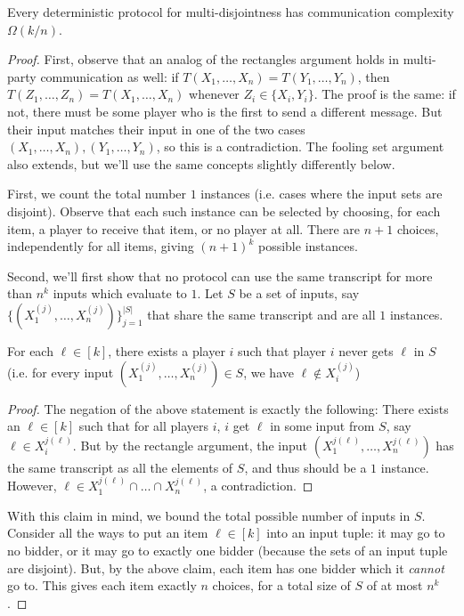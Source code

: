     \begin{theorem}
      Every deterministic protocol for
      multi-disjointness has communication complexity $\Omega(k/n)$.
    \end{theorem}
    \begin{proof}
      First, observe that an analog of the rectangles argument holds in
      multi-party communication as well: if $T(X_1,\ldots, X_n) = T(Y_1,\ldots,
      Y_n)$, then $T(Z_1,\ldots, Z_n) = T(X_1,\ldots, X_n)$ whenever $Z_i \in \{X_i,
      Y_i\}$. The proof is the same: if not, there must be some player who is the
      first to send a different message. But their input matches their input in one
      of the two cases $(X_1,\ldots, X_n), (Y_1,\ldots, Y_n)$, so this is a
      contradiction.
      The fooling set argument also extends, but we'll use the same concepts slightly
      differently below.

      First, we count the total number $1$ instances
      (i.e. cases where the input sets are disjoint).
      Observe that each such instance can be selected by choosing, for
      each item, a player to receive that item, or no player at all.
      There are $n+1$ choices, independently for all items,
      giving $(n+1)^k$ possible instances.

      Second, we'll first show that no protocol can use the same
      transcript for more than $n^k$ inputs which evaluate to $1$.
      Let $S$ be a set of inputs, say 
      $\{(X^{(j)}_1,\ldots,X^{(j)}_n)\}_{j=1}^{|S|}$ that
      share the same transcript and are all $1$ instances.
      \begin{claim}
        For each $\ell \in [k]$, there exists a player $i$
        such that player $i$ never gets $\ell$ in $S$
        (i.e. for every input $(X^{(j)}_1,\ldots,X^{(j)}_n)\in S$,
        we have $\ell \notin X^{(j)}_i$)
      \end{claim}
      \begin{proof}
        The negation of the above statement is exactly the following:
        There exists an $\ell\in[k]$ such that for all players $i$,
        $i$ get $\ell$ in some input from $S$, say 
        $\ell \in X^{j(\ell)}_i$.
        But by the rectangle argument, the input
        $ (X^{j(\ell)}_1, \ldots, X^{j(\ell)}_n) $ has the same transcript
        as all the elements of $S$, and thus should be a $1$ instance.
        However, $\ell \in X^{j(\ell)}_1 \cap \ldots \cap X^{j(\ell)}_n$,
        a contradiction.
      \end{proof}
      With this claim in mind, we bound the total possible number of inputs
      in $S$. Consider all the ways to put an item $\ell\in[k]$
      into an input tuple: it may go to no bidder, or it may go
      to exactly one bidder (because the sets of an input tuple are disjoint).
      But, by the above claim, each item has one bidder which it
      \emph{cannot} go to.
      This gives each item exactly $n$ choices,
      for a total size of $S$ of at most $n^k$.


\end{proof}

